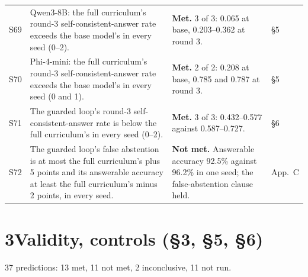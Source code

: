 \documentclass[10pt,a4paper]{article}
\newcommand{\met}{\textbf{Met.}}
\newcommand{\nmet}{\textbf{Not met.}}
\begin{document}
\begin{longtable}{@{}L{0.9cm}L{7.8cm}L{6.1cm}L{1.3cm}@{}}
S69 & Qwen3-8B: the full curriculum's round-3 self-consistent-answer rate exceeds the base model's in every seed (0--2). & \met{} 3 of 3: 0.065 at base, 0.203--0.362 at round 3. & \S5 \\
S70 & Phi-4-mini: the full curriculum's round-3 self-consistent-answer rate exceeds the base model's in every seed (0 and 1). & \met{} 2 of 2: 0.208 at base, 0.785 and 0.787 at round 3. & \S5 \\
S71 & The guarded loop's round-3 self-consistent-answer rate is below the full curriculum's in every seed (0--2). & \met{} 3 of 3: 0.432--0.577 against 0.587--0.727. & \S6 \\
S72 & The guarded loop's false abstention is at most the full curriculum's plus 5 points and its answerable accuracy at least the full curriculum's minus 2 points, in every seed. & \nmet{} Answerable accuracy 92.5\% against 96.2\% in one seed; the false-abstention clause held. & App.~C \\
\end{longtable}
\endgroup

\section*{3\quad Validity, controls (\S3, \S5, \S6)}
37 predictions: 13 met, 11 not met, 2 inconclusive, 11 not run.
\end{document}
